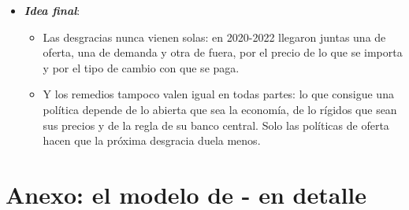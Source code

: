 \documentclass[11pt]{article}
\begin{document}
\begin{itemize}
  \begin{itemize}
  \item Los modelos estáticos dan la intuición, y los dinámicos, las condiciones. A la pregunta de qué efecto tiene una política, la respuesta honrada es «depende», pero el modelo dice de qué depende, y eso es lo que hay que medir.
  \item Y la política se juega en el ajuste, no en el punto de llegada. Lo dijo  en 1923: «este largo plazo es una mala guía para los asuntos de hoy. A largo plazo, todos muertos. Los economistas se ponen una tarea demasiado fácil y demasiado inútil si, en plena tempestad, solo saben decirnos que, cuando pase la tormenta, el mar volverá a estar en calma».\footnote{En el original: «But this long run is a misleading guide to current affairs. In the long run we are all dead. Economists set themselves too easy, too useless a task if in tempestuous seasons they can only tell us that when the storm is long past the ocean is flat again», en \textcite[cap.~3]{Keynes1923Tract}.}
  \end{itemize}
\item \textbf{\emph{Idea final}}:
  \begin{itemize}
  \item Las desgracias nunca vienen solas: en 2020-2022 llegaron juntas una de oferta, una de demanda y otra de fuera, por el precio de lo que se importa y por el tipo de cambio con que se paga.
  \item Y los remedios tampoco valen igual en todas partes: lo que consigue una política depende de lo abierta que sea la economía, de lo rígidos que sean sus precios y de la regla de su banco central. Solo las políticas de oferta hacen que la próxima desgracia duela menos.
  \end{itemize}
\end{itemize}

\clearpage
\appendix

\section{Anexo: el modelo de - en detalle}\label{anexo:mundell-fleming}
\end{document}
